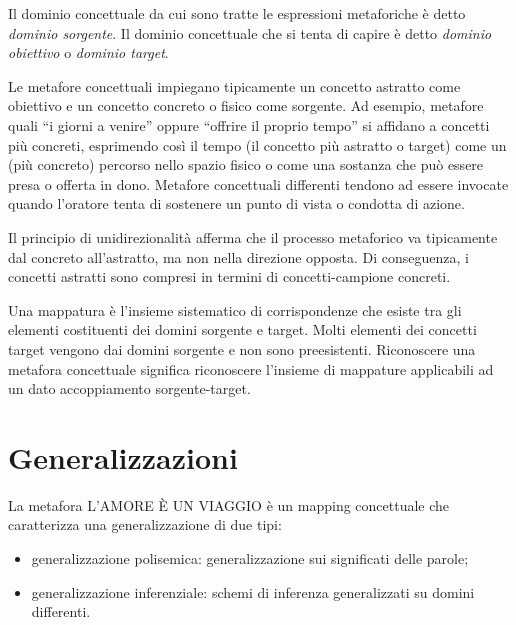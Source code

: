 Il dominio concettuale da cui sono tratte le espressioni metaforiche è detto \emph{dominio sorgente}. Il dominio concettuale che si tenta di capire è detto \emph{dominio obiettivo} o \emph{dominio target}.

Le metafore concettuali impiegano tipicamente un concetto astratto come obiettivo e un concetto concreto o fisico come sorgente. Ad esempio, metafore quali ``i giorni a venire'' oppure ``offrire il proprio tempo'' si affidano a concetti più concreti, esprimendo così il tempo (il concetto più astratto o target) come un (più concreto) percorso nello spazio fisico o come una sostanza che può essere presa o offerta in dono. Metafore concettuali differenti tendono ad essere invocate quando l'oratore tenta di sostenere un punto di vista o condotta di azione.

Il principio di unidirezionalità afferma che il processo metaforico va tipicamente dal concreto all'astratto, ma non nella direzione opposta. Di conseguenza, i concetti astratti sono compresi in termini di concetti-campione concreti.

Una mappatura è l'insieme sistematico di corrispondenze che esiste tra gli elementi costituenti dei domini sorgente e target. Molti elementi dei concetti target vengono dai domini sorgente e non sono preesistenti. Riconoscere una metafora concettuale significa riconoscere l'insieme di mappature applicabili ad un dato accoppiamento sorgente-target.

\section{Generalizzazioni}
La metafora L’AMORE È UN VIAGGIO è un mapping concettuale che caratterizza una generalizzazione di due tipi:
\begin{itemize}
  \item generalizzazione polisemica: generalizzazione sui significati delle parole;
  \item generalizzazione inferenziale: schemi di inferenza generalizzati su domini differenti.
\end{itemize}

